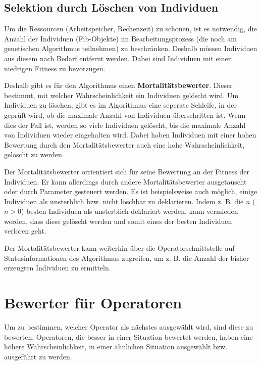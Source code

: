 \subsection{Selektion durch Löschen von Individuen}

Um die Ressourcen (Arbeitspeicher, Rechenzeit) zu schonen, ist es notwendig, die Anzahl der Individuen (Fib-Objekte) im Bearbeitungsprozess (die noch am genetischen Algorithmus teilnehmen) zu beschränken. Deshalb müssen Individuen aus diesem nach Bedarf entfernt werden. Dabei sind Individuen mit einer niedrigen Fitness zu bevorzugen.

Deshalb gibt es für den Algorithmus einen \textbf{Mortalitätsbewerter}. Dieser bestimmt, mit welcher Wahrscheinlichkeit ein Individuen gelöscht wird. Um Individuen zu löschen, gibt es im Algorithmus eine seperate Schleife, in der geprüft wird, ob die maximale Anzahl von Individuen überschritten ist. Wenn dies der Fall ist, werden so viele Individuen gelöscht, bis die maximale Anzahl von Individuen wieder eingehalten wird. Dabei haben Individuen mit einer hohen Bewertung durch den Mortalitätsbewerter auch eine hohe Wahrscheinlichkeit, gelöscht zu werden.

Der Mortalitätsbewerter orrientiert sich für seine Bewertung an der Fitness der Individuen. Er kann allerdings durch andere Mortalitätsbewerter ausgetauscht oder durch Parameter gesteuert werden. Es ist beispielsweise auch möglich, einige Individuen als unsterblich bzw. nicht löschbar zu deklarieren. Indem z. B. die $n$ ($n>0$) besten Individuen als unsterblich deklariert werden, kann vermieden werden, dass diese gelöscht werden und somit eines der besten Individuen verloren geht.

Der Mortalitätsbewerter kann weiterhin über die Operatorschnittstelle auf Statusinformationen des Algorithmus zugreifen, um z. B. die Anzahl der bisher erzeugten Individuen zu ermitteln.


\section{Bewerter für Operatoren}

Um zu bestimmen, welcher Operator als nächstes ausgewählt wird, sind diese zu bewerten. Operatoren, die besser in einer Situation bewertet werden, haben eine höhere Wahrscheinlichkeit, in einer ähnlichen Situation ausgewählt bzw. ausgeführt zu werden.

